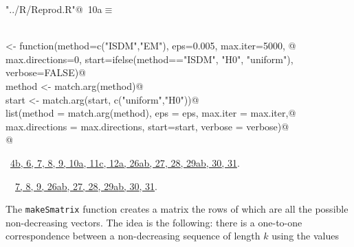\documentclass[reqno]{amsart}
\renewcommand{\NWtarget}[2]{\hypertarget{#1}{#2}}
\renewcommand{\NWlink}[2]{\hyperlink{#1}{#2}}
\begin{document}
\begin{flushleft} \small\label{scrap11}\raggedright\small
\NWtarget{nuweb10a}{} \verb@"../R/Reprod.R"@\nobreak\ {\footnotesize {10a}}$\equiv$
\vspace{-1ex}
\begin{list}{}{} \item
\mbox{}\verb@@\\
\mbox{}\verb@soControl <- function(method=c("ISDM","EM"), eps=0.005, max.iter=5000, @\\
\mbox{}\verb@      max.directions=0, start=ifelse(method=="ISDM", "H0", "uniform"), verbose=FALSE){@\\
\mbox{}\verb@  method <- match.arg(method)@\\
\mbox{}\verb@  start <- match.arg(start, c("uniform","H0"))@\\
\mbox{}\verb@  list(method = match.arg(method), eps = eps, max.iter = max.iter,@\\
\mbox{}\verb@       max.directions = max.directions, start=start, verbose = verbose)@\\
\mbox{}\verb@}@\\
\mbox{}\verb@@{\NWsep}
\end{list}
\vspace{-1.5ex}
\footnotesize
\begin{list}{}{\setlength{\itemsep}{-\parsep}\setlength{\itemindent}{-\leftmargin}}
\item \NWtxtFileDefBy\ \NWlink{nuweb4b}{4b}\NWlink{nuweb6}{, 6}\NWlink{nuweb7}{, 7}\NWlink{nuweb8}{, 8}\NWlink{nuweb9}{, 9}\NWlink{nuweb10a}{, 10a}\NWlink{nuweb11c}{, 11c}\NWlink{nuweb12a}{, 12a}\NWlink{nuweb26a}{, 26a}\NWlink{nuweb26b}{b}\NWlink{nuweb27}{, 27}\NWlink{nuweb28}{, 28}\NWlink{nuweb29a}{, 29a}\NWlink{nuweb29b}{b}\NWlink{nuweb30}{, 30}\NWlink{nuweb31}{, 31}.
\item \NWtxtIdentsDefed\nobreak\  \verb@soControl@\nobreak\ \NWlink{nuweb7}{7}\NWlink{nuweb8}{, 8}\NWlink{nuweb9}{, 9}\NWlink{nuweb26a}{, 26a}\NWlink{nuweb26b}{b}\NWlink{nuweb27}{, 27}\NWlink{nuweb28}{, 28}\NWlink{nuweb29a}{, 29a}\NWlink{nuweb29b}{b}\NWlink{nuweb30}{, 30}\NWlink{nuweb31}{, 31}.
\item{}
\end{list}
\vspace{4ex}
\end{flushleft}
The \texttt{makeSmatrix} function creates a matrix the rows of which are all the
possible non-decreasing vectors. The idea is the following: there is a one-to-one
correspondence between a non-decreasing sequence of length $k$ using the values
\end{document}
